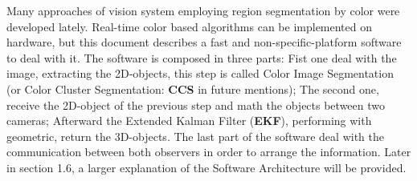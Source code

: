 Many approaches of vision system employing region segmentation by color were developed lately. Real-time color based algorithms can be implemented on hardware, but this document describes a fast and non-specific-platform software to deal with it. The software is composed in three parts: Fist one deal with the image, extracting the 2D-objects, this step is called Color Image Segmentation \cite{JamesBruce} (or Color Cluster Segmentation: \textbf{CCS} in future mentions); The second one, receive the 2D-object of the previous step and math the objects between two cameras; Afterward the Extended Kalman Filter (\textbf{EKF}), performing with geometric, return the 3D-objects. The last part of the software deal with the communication between both observers in order to arrange the information. Later in section 1.6, a larger explanation of the Software Architecture will be provided.